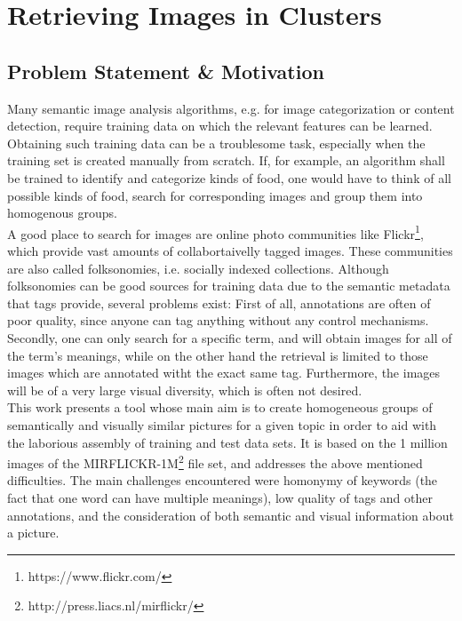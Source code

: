 \section{Retrieving Images in Clusters}
\label{sec_introduction}


\subsection{Problem Statement \& Motivation}
Many semantic image analysis algorithms, e.g. for image categorization or content detection, require training data on which the relevant features can be learned. Obtaining such training data can be a troublesome task, especially when the training set is created manually from scratch. If, for example, an algorithm shall be trained to identify and categorize kinds of food, one would have to think of all possible kinds of food, search for corresponding images and group them into homogenous groups. \\
A good place to search for images are online photo communities like Flickr\footnote{https://www.flickr.com/}, which provide vast amounts of collabortaivelly tagged images. These communities are also called folksonomies, i.e. socially indexed collections.
Although folksonomies can be good sources for training data due to the semantic metadata that tags provide, several problems exist: First of all, annotations are often of poor quality, since anyone can tag anything without any control mechanisms. Secondly, one can only search for a specific term, and will obtain images for all of the term's meanings, while on the other hand the retrieval is limited to those images which are annotated witht the exact same tag. Furthermore, the images will be of a very large visual diversity, which is often not desired. \\

This work presents a tool whose main aim is to create homogeneous groups of semantically and visually similar pictures for a given topic in order to aid with the laborious assembly of training and test data sets. It is based on the 1 million images of the MIRFLICKR-1M\footnote{http://press.liacs.nl/mirflickr/} file set, and addresses the above mentioned difficulties. The main challenges encountered were homonymy of keywords (the fact that one word can have multiple meanings), low quality of tags and other annotations, and the consideration of both semantic and visual information about a picture.

